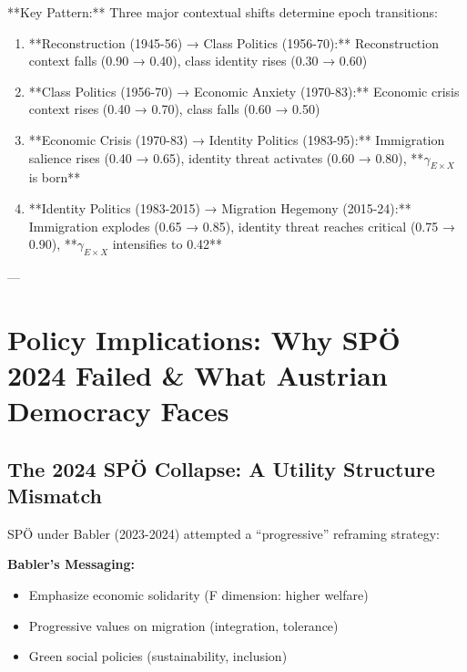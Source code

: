 **Key Pattern:** Three major contextual shifts determine epoch transitions:

\begin{enumerate}

\item **Reconstruction (1945-56) → Class Politics (1956-70):** Reconstruction context falls (0.90 → 0.40), class identity rises (0.30 → 0.60)

\item **Class Politics (1956-70) → Economic Anxiety (1970-83):** Economic crisis context rises (0.40 → 0.70), class falls (0.60 → 0.50)

\item **Economic Crisis (1970-83) → Identity Politics (1983-95):** Immigration salience rises (0.40 → 0.65), identity threat activates (0.60 → 0.80), **$\gamma_{E \times X}$ is born**

\item **Identity Politics (1983-2015) → Migration Hegemony (2015-24):** Immigration explodes (0.65 → 0.85), identity threat reaches critical (0.75 → 0.90), **$\gamma_{E \times X}$ intensifies to 0.42**

\end{enumerate}

---

\clearpage


\section{Policy Implications: Why SPÖ 2024 Failed \& What Austrian Democracy Faces}
\label{sec:implications}

\subsection{The 2024 SPÖ Collapse: A Utility Structure Mismatch}

SPÖ under Babler (2023-2024) attempted a ``progressive'' reframing strategy:

\textbf{Babler's Messaging:}
\begin{itemize}[nosep]
\item Emphasize economic solidarity (F dimension: higher welfare)
\item Progressive values on migration (integration, tolerance)
\item Green social policies (sustainability, inclusion)
\end{itemize}


